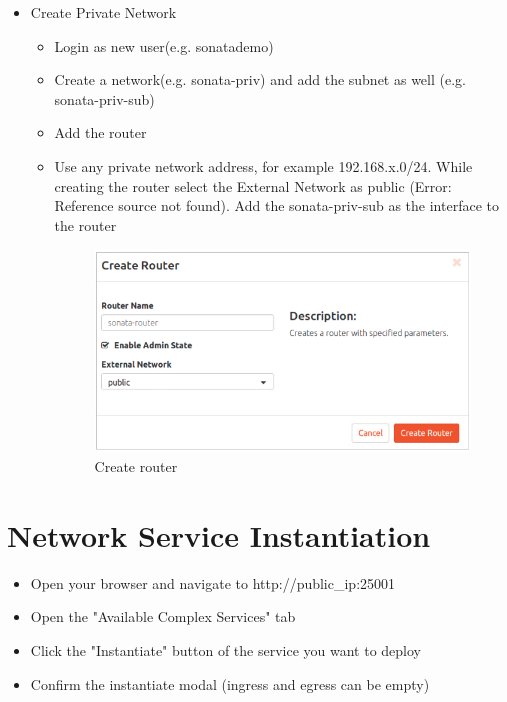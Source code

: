 \begin{itemize}
\begin{itemize}
		\end{itemize}
		\newpage
		\item Create Private Network
		\begin{itemize}
			\item Login as new user(e.g. sonatademo)
			\item Create a network(e.g. sonata-priv) and add the subnet as well (e.g. sonata-priv-sub)
			\item Add the router
			\item Use any private network address, for example 192.168.x.0/24. While creating the router select the External Network as public (Error: Reference source not found). Add the sonata-priv-sub as the interface to the router
			\begin{figure}[h]
				\centering
				\includegraphics[width=0.6\linewidth]{figures/CreateRouter}
				\caption{Create router}
				\label{fig:createrouter}
			\end{figure}		
		\end{itemize}
	\end{itemize}
	
	\newpage
	
	\section{Network Service Instantiation}
	\label{sec:Network Service Instantiation}
	\begin{itemize}
		\item Open your browser and navigate to http://public\_ip:25001
		\item Open the "Available Complex Services" tab
		\item Click the "Instantiate" button of the service you want to deploy
		\item Confirm the instantiate modal (ingress and egress can be empty)
		
	\end{itemize}
	



